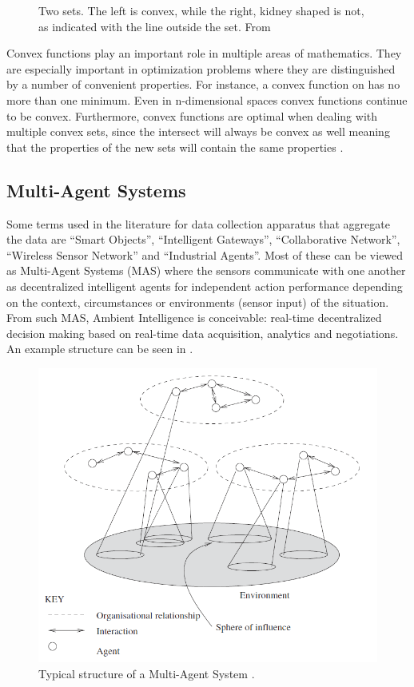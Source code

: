 \begin{figure}
	\centering
	\caption{Two sets. The left is convex, while the right, kidney shaped is not, as indicated with the line outside the set. From \citep{boyd2004convex}}
	\label{fig:convex}
\end{figure}


Convex functions play an important role in multiple areas of mathematics. They are especially important in optimization problems where they are distinguished by a number of convenient properties. For instance, a convex function on has no more than one minimum. Even in n-dimensional spaces convex functions continue to be convex. Furthermore, convex functions are optimal when dealing with multiple convex sets, since the intersect will always be convex as well meaning that the properties of the new sets will contain the same properties  \citep{boyd2004convex}. 
\subsection{Multi-Agent Systems}

Some terms used in the literature for data collection apparatus that aggregate the data are ``Smart Objects'', ``Intelligent Gateways'', ``Collaborative Network'', ``Wireless Sensor Network'' and ``Industrial Agents''. Most of these can be viewed as Multi-Agent Systems (MAS) where the sensors communicate with one another as decentralized intelligent agents for independent action performance depending on the context, circumstances or environments (sensor input) of the situation. From such MAS, Ambient Intelligence  is conceivable: real-time decentralized decision making based on real-time data acquisition, analytics and negotiations. An example structure can be seen in .

\begin{figure}[h]
	\centering
	\includegraphics[width=0.7\linewidth]{./img/MAS_example}
	\caption{Typical structure of a Multi-Agent System \citep{wooldridge2009introduction}.}
	\label{fig:MAS_example}
\end{figure}

